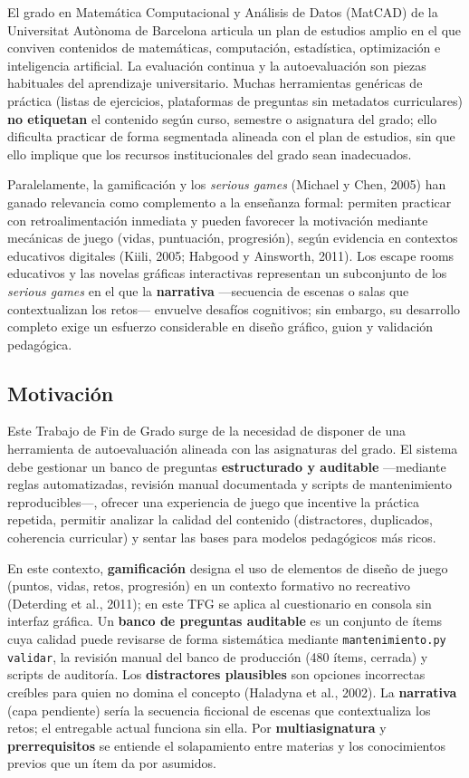\documentclass[11pt,a4paper]{article}
\begin{document}
El grado en Matemática Computacional y Análisis de Datos (MatCAD) de la Universitat Autònoma de Barcelona articula un plan de estudios amplio en el que conviven contenidos de matemáticas, computación, estadística, optimización e inteligencia artificial. La evaluación continua y la autoevaluación son piezas habituales del aprendizaje universitario. Muchas herramientas genéricas de práctica (listas de ejercicios, plataformas de preguntas sin metadatos curriculares) \textbf{no etiquetan} el contenido según curso, semestre o asignatura del grado; ello dificulta practicar de forma segmentada alineada con el plan de estudios, sin que ello implique que los recursos institucionales del grado sean inadecuados.

Paralelamente, la gamificación y los \textit{serious games} (Michael y Chen, 2005) han ganado relevancia como complemento a la enseñanza formal: permiten practicar con retroalimentación inmediata y pueden favorecer la motivación mediante mecánicas de juego (vidas, puntuación, progresión), según evidencia en contextos educativos digitales (Kiili, 2005; Habgood y Ainsworth, 2011). Los escape rooms educativos y las novelas gráficas interactivas representan un subconjunto de los \textit{serious games} en el que la \textbf{narrativa} ---secuencia de escenas o salas que contextualizan los retos--- envuelve desafíos cognitivos; sin embargo, su desarrollo completo exige un esfuerzo considerable en diseño gráfico, guion y validación pedagógica.

\subsection{Motivación}

Este Trabajo de Fin de Grado surge de la necesidad de disponer de una herramienta de autoevaluación alineada con las asignaturas del grado. El sistema debe gestionar un banco de preguntas \textbf{estructurado y auditable} ---mediante reglas automatizadas, revisión manual documentada y scripts de mantenimiento reproducibles---, ofrecer una experiencia de juego que incentive la práctica repetida, permitir analizar la calidad del contenido (distractores, duplicados, coherencia curricular) y sentar las bases para modelos pedagógicos más ricos.

En este contexto, \textbf{gamificación} designa el uso de elementos de diseño de juego (puntos, vidas, retos, progresión) en un contexto formativo no recreativo (Deterding et al., 2011); en este TFG se aplica al cuestionario en consola sin interfaz gráfica. Un \textbf{banco de preguntas auditable} es un conjunto de ítems cuya calidad puede revisarse de forma sistemática mediante \texttt{mantenimiento.py validar}, la revisión manual del banco de producción (480 ítems, cerrada) y scripts de auditoría. Los \textbf{distractores plausibles} son opciones incorrectas creíbles para quien no domina el concepto (Haladyna et al., 2002). La \textbf{narrativa} (capa pendiente) sería la secuencia ficcional de escenas que contextualiza los retos; el entregable actual funciona sin ella. Por \textbf{multiasignatura} y \textbf{prerrequisitos} se entiende el solapamiento entre materias y los conocimientos previos que un ítem da por asumidos.
\end{document}
